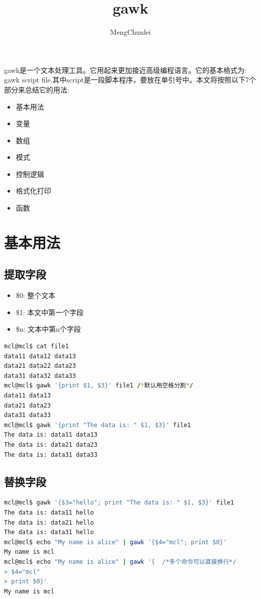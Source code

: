 \documentclass{article}
\title{gawk}
\author{MengChunlei}
\begin{document}
\maketitle
gawk是一个文本处理工具。它用起来更加接近高级编程语言。它的基本格式为: gawk script file.其中script是一段脚本程序，要放在单引号中。本文将按照以下7个部分来总结它的用法: \par
\begin{itemize}
	\item 基本用法
	\item 变量
	\item 数组
	\item 模式
    \item 控制逻辑
	\item 格式化打印
	\item 函数
\end{itemize}

\section{基本用法}
\subsection{提取字段}
\begin{itemize}
	\item \$0: 整个文本
	\item \$1: 本文中第一个字段
	\item \$n: 文本中第n个字段
\end{itemize}

\begin{lstlisting}[language=bash, caption={1.1}]
mcl@mcl$ cat file1 
data11 data12 data13
data21 data22 data23
data31 data32 data33
mcl@mcl$ gawk '{print $1, $3}' file1 /*默认用空格分割*/
data11 data13
data21 data23
data31 data33
mcl@mcl$ gawk '{print "The data is: " $1, $3}' file1 
The data is: data11 data13
The data is: data21 data23
The data is: data31 data33
\end{lstlisting}

\subsection{替换字段}
\begin{lstlisting}[language=bash, caption={1.2}]
mcl@mcl$ gawk '{$3="hello"; print "The data is: " $1, $3}' file1 
The data is: data11 hello
The data is: data21 hello
The data is: data31 hello
mcl@mcl$ echo "My name is alice" | gawk '{$4="mcl"; print $0}'
My name is mcl
mcl@mcl$ echo "My name is alice" | gawk '{  /*多个命令可以直接换行*/
> $4="mcl"
> print $0}'
My name is mcl
\end{lstlisting}
\end{document}
